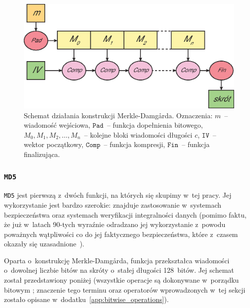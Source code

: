 \begin{figure}[H]
    \includegraphics[width=12cm]{img/merkle_damgard.eps}
    \caption{Schemat działania konstrukcji Merkle-Damg\r{a}rda. Oznaczenia:
    $m$~-- wiadomość wejściowa, $\mathtt{Pad}$~-- funkcja dopełnienia bitowego,
    $M_0, M_1, M_2, \ldots, M_n$~-- kolejne bloki wiadomości długości $c$,
    $\mathtt{IV}$~-- wektor początkowy, $\mathtt{Comp}$~-- funkcja kompresji,
    $\mathtt{Fin}$~-- funkcja finalizująca.}
    \label{fig:merkle_damgard}
\end{figure}



\subsubsection{\texttt{MD5}}
\texttt{MD5} jest pierwszą z~dwóch funkcji, na których się skupimy w~tej pracy.
Jej wykorzystanie jest bardzo szerokie: znajduje zastosowanie w~systemach
bezpieczeństwa oraz systemach weryfikacji integralności danych (pomimo faktu,
że już w~latach 90-tych wyraźnie odradzano jej wykorzystanie z~powodu
poważnych wątpliwości co do jej faktycznego bezpieczeństwa, które z~czasem
okazały się uzasadnione~\cite{ps3_attack}).

Oparta o~konstrukcję Merkle-Damg\r{a}rda, funkcja przekształca wiadomości
o~dowolnej liczbie bitów na skróty o~stałej długości 128~bitów. Jej
schemat~\cite{md5_definition} został przedstawiony poniżej (wszystkie operacje
są dokonywane w~porządku bitowym ; znaczenie tego terminu
oraz operatorów wprowadzonych w~tej sekcji zostało opisane
w~dodatku~\ref{app:bitwise_operations}).

